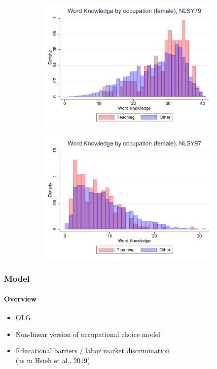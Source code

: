 \documentclass[11pt]{beamer}
\begin{document}
\begin{frame}
\begin{adjustwidth}{2em}{2em}
\begin{figure}[ht!]
\begin{subfigure}[b]{0.27\textwidth}
					\includegraphics[width=\textwidth]{plots/nlsy79_wk_occ_no_norm_female_no_lf.pdf}
				\end{subfigure}
				\hfill
				\begin{subfigure}[b]{0.27\textwidth}
					\centering
					\includegraphics[width=\textwidth]{plots/nlsy97_wk_occ_no_norm_female_no_lf.pdf}
				\end{subfigure}	
			\end{figure}
			\vfill
		\end{adjustwidth}
	\end{frame}
	
	\begin{frame}
		\frametitle{Model}
		\framesubtitle{Overview}
		\begin{itemize}
			\item OLG
			\item Non-linear version of occupational choice model
			\item Educational barriers / labor market discrimination \\
			(as in Hsieh et al., 2019)
		\end{itemize}
	\end{frame}
	
\end{document}
